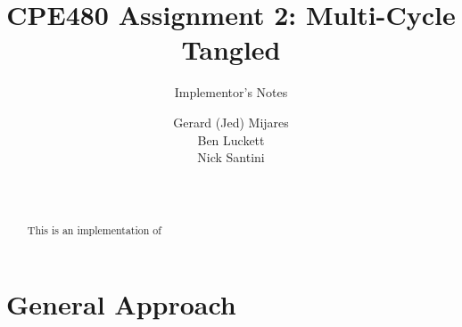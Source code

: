 \documentclass{sig-alternate-05-2015}
\begin{document}

\title{CPE480 Assignment 2: Multi-Cycle Tangled }
\subtitle{Implementor's Notes}

\author{
Gerard (Jed) Mijares\\
Ben Luckett\\
Nick Santini\\
       \\
       \\
}


\maketitle
\begin{abstract}
This is an implementation of 
\end{abstract}


\section{General Approach}




\end{document}
